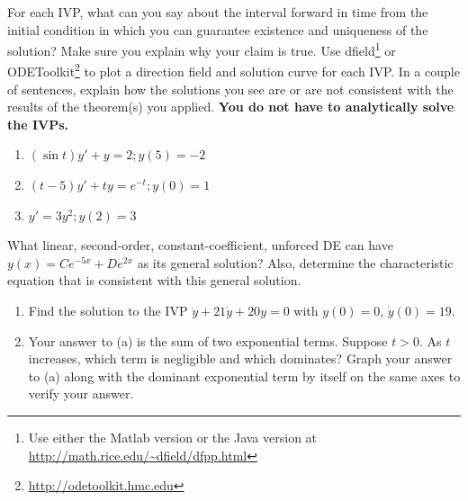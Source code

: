 \documentclass[12pt,letterpaper]{hmcpset}
\begin{document}
\newpage
\begin{solution}
    \null\vfill
\end{solution}
\newpage

\begin{problem}[2]
    For each IVP, what can you say about the interval forward in time from the initial condition in which you can guarantee existence and uniqueness of the solution?  Make sure you explain why your claim is true.   Use dfield\footnote{Use either the Matlab version or the Java version at \url{http://math.rice.edu/~dfield/dfpp.html}} or ODEToolkit\footnote{\url{http://odetoolkit.hmc.edu}} to plot a direction field and solution curve for each IVP.  In a couple of sentences, explain how the solutions you see are or are not consistent with the results of the theorem(s) you applied.  \textbf{You do not have to analytically solve the IVPs.}
    \begin{enumerate}
        \item $(\sin t) y' + y = 2; y(5) = -2$ 
        \item $(t-5) y'+ t y = e^{-t}; y(0) = 1$
        \item  $y'=3y^2; y(2)= 3$
    \end{enumerate}
\end{problem}

\begin{solution}
    \vfill
\end{solution}
\newpage

\begin{problem}[3]
    What linear, second-order, constant-coefficient, unforced DE can have $y(x)=Ce^{-5x}+De^{2x}$ as its general solution? Also, determine the characteristic equation that is consistent with this general solution.
\end{problem}

\begin{solution}
    \vfill
\end{solution}
\newpage

\begin{problem}[4]\begin{enumerate}
    \item Find the solution to the IVP $\ddot{y}+21\dot{y}+20y=0$ with $y(0)=0$, $\dot{y}(0)=19$.
    \item Your answer to (a) is the sum of two exponential terms. Suppose $t>0$. As $t$ increases, which term is negligible and which dominates? Graph your answer to (a) along with the dominant exponential term by itself on the same axes to verify your answer.
\end{enumerate}
\end{problem}
\end{document}
